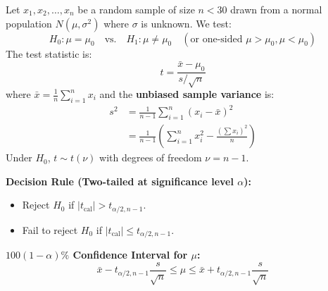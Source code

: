 \documentclass[12pt,a4paper]{article}
\begin{document}
\begin{tcolorbox}[formulabox, title={\textbf{Test 1: Single Mean $t$-Test Formulation}}]
Let $x_1, x_2, \ldots, x_n$ be a random sample of size $n < 30$ drawn from a normal population $N(\mu, \sigma^2)$ where $\sigma$ is unknown. We test:
\begin{equation}
  H_0: \mu = \mu_0 \quad \text{vs.} \quad H_1: \mu \ne \mu_0 \quad (\text{or one-sided } \mu > \mu_0, \mu < \mu_0)
\end{equation}
The test statistic is:
\begin{equation}
  t = \frac{\bar{x} - \mu_0}{s / \sqrt{n}}
\end{equation}
where $\bar{x} = \frac{1}{n}\sum_{i=1}^n x_i$ and the \textbf{unbiased sample variance} is:
\begin{equation}
  \begin{aligned}
    s^2 &= \frac{1}{n - 1} \sum_{i=1}^n (x_i - \bar{x})^2 \\[3pt]
    &= \frac{1}{n - 1}\left(\sum_{i=1}^n x_i^2 - \frac{(\sum x_i)^2}{n}\right)
  \end{aligned}
\end{equation}
Under $H_0$, $t \sim t(\nu)$ with degrees of freedom $\nu = n - 1$.

\textbf{Decision Rule (Two-tailed at significance level $\alpha$):}
\begin{itemize}[leftmargin=12pt, itemsep=2pt]
  \item Reject $H_0$ if $|t_{\text{cal}}| > t_{\alpha/2, n-1}$.
  \item Fail to reject $H_0$ if $|t_{\text{cal}}| \le t_{\alpha/2, n-1}$.
\end{itemize}
\textbf{$100(1-\alpha)\%$ Confidence Interval for $\mu$:}
\begin{equation}
  \bar{x} - t_{\alpha/2, n-1} \frac{s}{\sqrt{n}} \le \mu \le \bar{x} + t_{\alpha/2, n-1} \frac{s}{\sqrt{n}}
\end{equation}
\end{tcolorbox}
\end{document}
